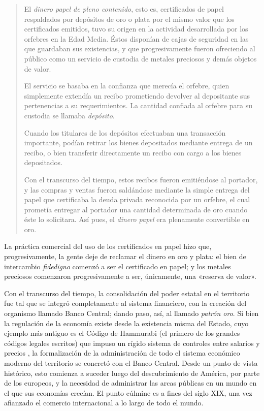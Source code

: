 \documentclass[12pt,a4paper,twoside]{book}
\begin{document}
\begin{quotation}
El \textit{dinero papel de pleno contenido}, esto es, certificados de papel respaldados por depósitos de oro o plata por el mismo valor que los certificados emitidos, tuvo su origen en la actividad desarrollada por los orfebres en la Edad Media. Éstos disponían de cajas de seguridad en las que guardaban sus existencias, y que progresivamente fueron ofreciendo al público como un servicio de custodia de metales preciosos y demás objetos de valor.

El servicio se basaba en la confianza que merecía el orfebre, quien simplemente extendía un recibo prometiendo devolver al depositante sus pertenencias a su requerimientos. La cantidad confiada al orfebre para su custodia se llamaba \textit{depósito}.

Cuando los titulares de los depósitos efectuaban una transacción importante, podían retirar los bienes depositados mediante entrega de un recibo, o bien transferir directamente un recibo con cargo a los bienes depositados.

Con el transcurso del tiempo, estos recibos fueron emitiéndose al portador, y las compras y ventas fueron saldándose mediante la simple entrega del papel que certificaba la deuda privada reconocida por un orfebre, el cual prometía entregar al portador una cantidad determinada de oro cuando éste lo solicitara. Así pues, el \textit{dinero papel} era plenamente convertible en oro. \cite[pág. 265]{mochobeker}
\end{quotation}

La práctica comercial del uso de los certificados en papel hizo que, progresivamente, la gente deje de reclamar el dinero en oro y plata: el bien de intercambio \textit{fidedigno} comenzó a ser el certificado en papel; y los metales preciosos comenzaron progresivamente a ser, únicamente, una «reserva de valor».

Con el transcurso del tiempo, la consolidación del poder estatal en el territorio fue tal que se integró completamente al sistema financiero, con la creación del organismo llamado Banco Central; dando paso, así, al llamado \textit{patrón oro}. Si bien la regulación de la economía existe desde la existencia misma del Estado, cuyo ejemplo más antiguo es el Código de Hammurabi (el primero de los grandes códigos legales escritos) que impuso un rígido sistema de controles entre salarios y precios \cite[pág. 26]{4milanos}, la formalización de la administración de todo el sistema económico moderno del territorio se concretó con el Banco Central. Desde un punto de vista histórico, esto comienza a suceder luego del descubrimiento de América, por parte de los europeos, y la necesidad de administrar las arcas públicas en un mundo en el que sus economías crecían. El punto cúlmine es a fines del siglo XIX, una vez afianzado el comercio internacional a lo largo de todo el mundo.
\end{document}
